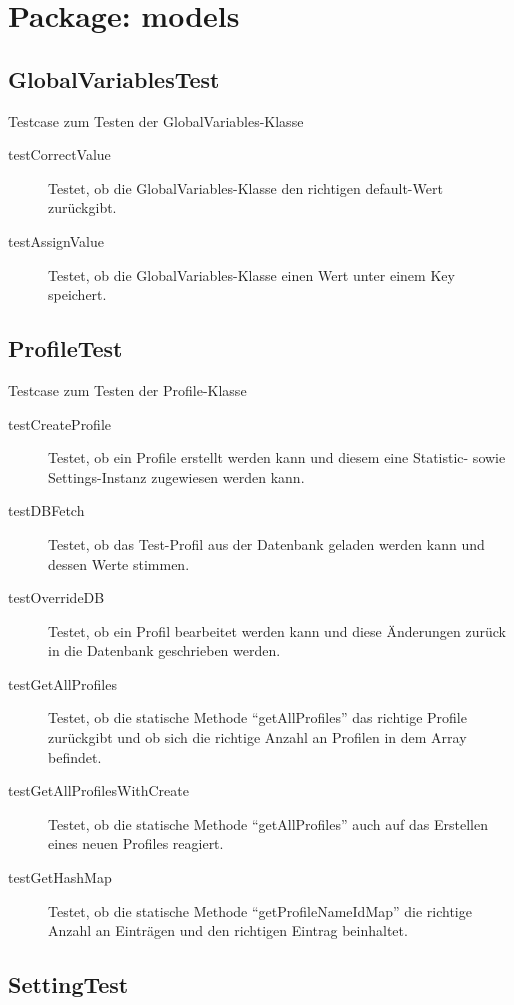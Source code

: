 \documentclass[parskip=full]{scrreprt}
\begin{document}
\section{Package: models}

\subsection{GlobalVariablesTest}

Testcase zum Testen der GlobalVariables-Klasse

\begin{description}
\item[testCorrectValue]
	Testet, ob die GlobalVariables-Klasse den richtigen default-Wert zurückgibt.
\item[testAssignValue]
	Testet, ob die GlobalVariables-Klasse einen Wert unter einem Key speichert.
\end{description}

\subsection{ProfileTest}

Testcase zum Testen der Profile-Klasse

\begin{description}
	\item[testCreateProfile] Testet, ob ein Profile erstellt werden kann und diesem eine Statistic- sowie Settings-Instanz zugewiesen werden kann.
	\item[testDBFetch] Testet, ob das Test-Profil aus der Datenbank geladen werden kann und dessen Werte stimmen.
	\item[testOverrideDB] Testet, ob ein Profil bearbeitet werden kann und diese Änderungen zurück in die Datenbank geschrieben werden.
	\item[testGetAllProfiles] Testet, ob die statische Methode \enquote{getAllProfiles} das richtige Profile zurückgibt und ob sich die richtige Anzahl an Profilen in dem Array befindet.
	\item[testGetAllProfilesWithCreate] Testet, ob die statische Methode \enquote{getAllProfiles} auch auf das Erstellen eines neuen Profiles reagiert.
	\item[testGetHashMap] Testet, ob die statische Methode \enquote{getProfileNameIdMap} die richtige Anzahl an Einträgen und den richtigen Eintrag beinhaltet.
\end{description}

\subsection{SettingTest}
\end{document}
